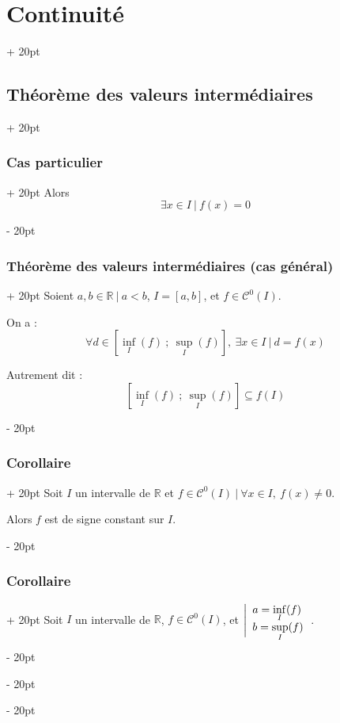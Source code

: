 \documentclass[a4paper, 12pt, twoside]{article}
\newcommand{\R}{\mathbb{R}} %
\newcommand{\seg}[2]{\left[ #1\ ;\ #2 \right]}
\newcommand{\ind}[1][20pt]{\advance\leftskip + #1}
\newcommand{\deind}[1][20pt]{\advance\leftskip - #1}
\newenvironment{indt}[2][20pt]{#2 \par \ind[#1]}{\par \deind} %
\begin{document}
\begin{indt}{\section{Continuité}}
\begin{indt}{\subsection{Théorème des valeurs intermédiaires}}
\begin{indt}{\subsubsection{Cas particulier}}
                Alors
                \[
                    \exists x \in I\ |\ f(x) = 0
                \]
            \end{indt}

            \vspace{12pt}
            
            \begin{indt}{\subsubsection{Théorème des valeurs intermédiaires (cas général)}}
                Soient $a, b \in \R\ |\ a < b$, $I = [a, b]$, et $f \in \mathcal C^0(I)$.

                On a :
                \[
                    \forall d \in \seg{\inf_I(f)}{\sup_I(f)},\
                    \exists x \in I\ |\
                    d = f(x)
                \]

                Autrement dit :
                \[
                    \seg{\inf_I(f)}{\sup_I(f)} \subseteq f(I)
                \]
            \end{indt}

            \vspace{12pt}
            
            \begin{indt}{\subsubsection{Corollaire}}
                Soit $I$ un intervalle de $\R$ et $f \in \mathcal C^0(I)\ |\ \forall x \in I,\ f(x) \neq 0$.

                Alors $f$ est de signe constant sur $I$.
            \end{indt}

            \vspace{12pt}
            
            \begin{indt}{\subsubsection{Corollaire}}
                Soit $I$ un intervalle de $\R$, $f \in \mathcal C^0(I)$, et
                $
                    \left|
                    \begin{array}{l}
                        \displaystyle a = \inf_I(f)
                        \\
                        \displaystyle b = \sup_I(f)
                        \vspace{-3pt}
                    \end{array}
                    \right.
                $.


\end{indt}
\end{indt}
\end{indt}
\end{document}
